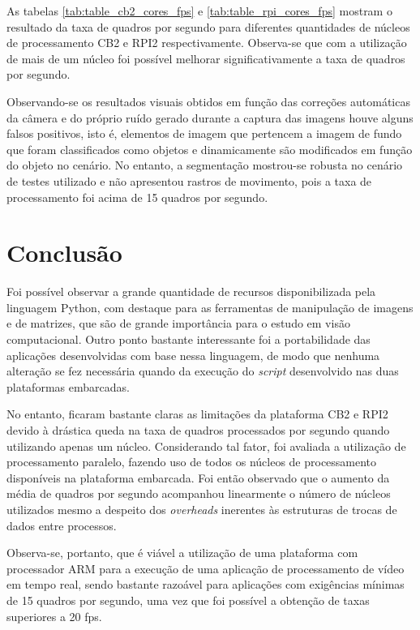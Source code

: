 \documentclass[conference]{IEEEtran}
\begin{document}
As tabelas \ref{tab:table_cb2_cores_fps} e \ref{tab:table_rpi_cores_fps} mostram o resultado da taxa de quadros por segundo para diferentes quantidades de núcleos de processamento CB2 e RPI2 respectivamente. Observa-se que com a utilização de mais de um núcleo foi possível melhorar significativamente a taxa de quadros por segundo.

Observando-se os resultados visuais obtidos em função das correções automáticas da câmera e do próprio ruído gerado durante a captura das imagens houve alguns falsos positivos, isto é, elementos de imagem que pertencem a imagem de fundo que foram classificados como objetos e dinamicamente são modificados em função do objeto no cenário. No entanto, a segmentação mostrou-se robusta no cenário de testes utilizado e não apresentou rastros de movimento, pois a taxa de processamento foi acima de 15 quadros por segundo.

\section{Conclusão}
Foi possível observar a grande quantidade de recursos disponibilizada pela linguagem Python, com destaque para as ferramentas de manipulação de imagens e de matrizes, que são de grande importância para o estudo em visão computacional. Outro ponto bastante interessante foi a portabilidade das aplicações desenvolvidas com base nessa linguagem, de modo que nenhuma alteração se fez necessária quando da execução do \textit{script} desenvolvido nas duas plataformas embarcadas.

No entanto, ficaram bastante claras as limitações da plataforma CB2 e RPI2 devido à drástica queda na taxa de quadros processados por segundo quando utilizando apenas um núcleo. Considerando tal fator, foi avaliada a utilização de processamento paralelo, fazendo uso de todos os núcleos de processamento disponíveis na plataforma embarcada. Foi então observado que o aumento da média de quadros por segundo acompanhou linearmente o número de núcleos utilizados mesmo a despeito dos \textit{overheads} inerentes às estruturas de trocas de dados entre processos.

Observa-se, portanto, que é viável a utilização de uma plataforma com processador ARM para a execução de uma aplicação de processamento de vídeo em tempo real, sendo bastante razoável para aplicações com exigências mínimas de 15 quadros por segundo, uma vez que foi possível a obtenção de taxas superiores a 20 fps. 
\end{document}
